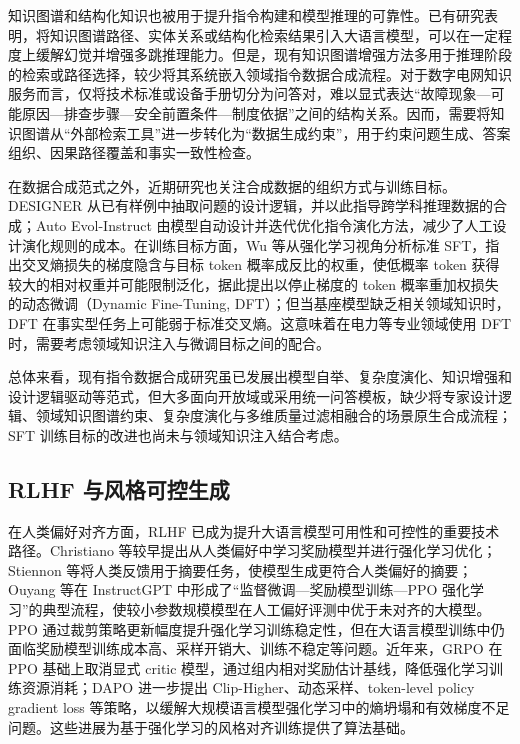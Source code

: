 \documentclass[fontset=fandol,type=master,campus=shenzhen,etitleauto=true]{hithesisbook}
\begin{document}
知识图谱和结构化知识也被用于提升指令构建和模型推理的可靠性。已有研究表明，将知识图谱路径、实体关系或结构化检索结果引入大语言模型，可以在一定程度上缓解幻觉并增强多跳推理能力\cite{ref15,ref16}。但是，现有知识图谱增强方法多用于推理阶段的检索或路径选择，较少将其系统嵌入领域指令数据合成流程。对于数字电网知识服务而言，仅将技术标准或设备手册切分为问答对，难以显式表达“故障现象—可能原因—排查步骤—安全前置条件—制度依据”之间的结构关系。因而，需要将知识图谱从“外部检索工具”进一步转化为“数据生成约束”，用于约束问题生成、答案组织、因果路径覆盖和事实一致性检查。

在数据合成范式之外，近期研究也关注合成数据的组织方式与训练目标。DESIGNER 从已有样例中抽取问题的设计逻辑，并以此指导跨学科推理数据的合成\cite{ref54}；Auto Evol-Instruct 由模型自动设计并迭代优化指令演化方法，减少了人工设计演化规则的成本\cite{ref53}。在训练目标方面，Wu 等从强化学习视角分析标准 SFT，指出交叉熵损失的梯度隐含与目标 token 概率成反比的权重，使低概率 token 获得较大的相对权重并可能限制泛化，据此提出以停止梯度的 token 概率重加权损失的动态微调（Dynamic Fine-Tuning, DFT）；但当基座模型缺乏相关领域知识时，DFT 在事实型任务上可能弱于标准交叉熵\cite{ref82}。这意味着在电力等专业领域使用 DFT 时，需要考虑领域知识注入与微调目标之间的配合。

总体来看，现有指令数据合成研究虽已发展出模型自举、复杂度演化、知识增强和设计逻辑驱动等范式，但大多面向开放域或采用统一问答模板，缺少将专家设计逻辑、领域知识图谱约束、复杂度演化与多维质量过滤相融合的场景原生合成流程；SFT 训练目标的改进也尚未与领域知识注入结合考虑。

\subsection{RLHF 与风格可控生成}

在人类偏好对齐方面，RLHF 已成为提升大语言模型可用性和可控性的重要技术路径。Christiano 等较早提出从人类偏好中学习奖励模型并进行强化学习优化\cite{ref30}；Stiennon 等将人类反馈用于摘要任务，使模型生成更符合人类偏好的摘要\cite{ref31}；Ouyang 等在 InstructGPT 中形成了“监督微调—奖励模型训练—PPO 强化学习”的典型流程，使较小参数规模模型在人工偏好评测中优于未对齐的大模型\cite{ref32}。PPO 通过裁剪策略更新幅度提升强化学习训练稳定性\cite{ref33}，但在大语言模型训练中仍面临奖励模型训练成本高、采样开销大、训练不稳定等问题。近年来，GRPO 在 PPO 基础上取消显式 critic 模型，通过组内相对奖励估计基线，降低强化学习训练资源消耗\cite{ref34}；DAPO 进一步提出 Clip-Higher、动态采样、token-level policy gradient loss 等策略，以缓解大规模语言模型强化学习中的熵坍塌和有效梯度不足问题\cite{ref35}。这些进展为基于强化学习的风格对齐训练提供了算法基础。
\end{document}
